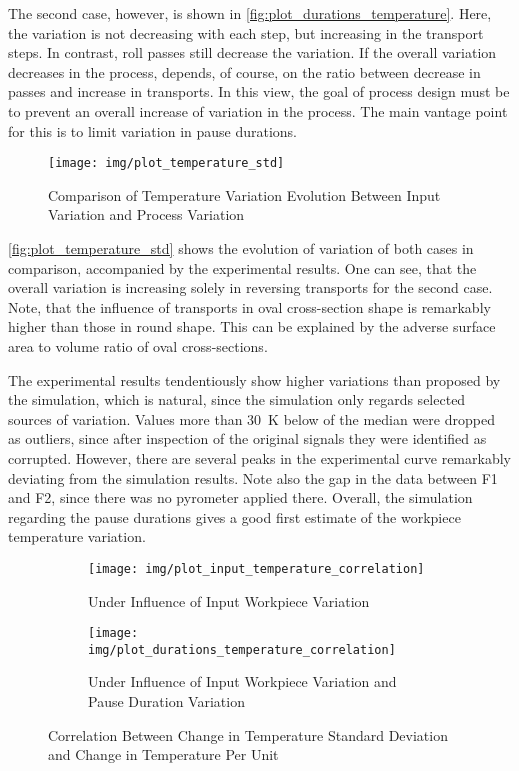 The second case, however, is shown in \autoref{fig:plot_durations_temperature}.
Here, the variation is not decreasing with each step, but increasing in the transport steps.
In contrast, roll passes still decrease the variation.
If the overall variation decreases in the process, depends, of course, on the ratio between decrease in passes and increase in transports.
In this view, the goal of process design must be to prevent an overall increase of variation in the process.
The main vantage point for this is to limit variation in pause durations.

\begin{figure}
    \centering
    \texttt{[image: img/plot\_temperature\_std]}
    \caption{Comparison of Temperature Variation Evolution Between Input Variation and Process Variation}
    \label{fig:plot_temperature_std}
\end{figure}

\autoref{fig:plot_temperature_std} shows the evolution of variation of both cases in comparison, accompanied by the experimental results.
One can see, that the overall variation is increasing solely in reversing transports for the second case.
Note, that the influence of transports in oval cross-section shape is remarkably higher than those in round shape.
This can be explained by the adverse surface area to volume ratio of oval cross-sections.

The experimental results tendentiously show higher variations than proposed by the simulation, which is natural, since the simulation only regards selected sources of variation.
Values more than \qty{30}{\kelvin} below of the median were dropped as outliers, since after inspection of the original signals they were identified as corrupted.
However, there are several peaks in the experimental curve remarkably deviating from the simulation results.
Note also the gap in the data between F1 and F2, since there was no pyrometer applied there.
Overall, the simulation regarding the pause durations gives a good first estimate of the workpiece temperature variation.

\begin{figure}
    \begin{subfigure}{\linewidth}
        \centering
        \texttt{[image: img/plot\_input\_temperature\_correlation]}
        \caption{Under Influence of Input Workpiece Variation}
        \label{fig:plot_input_temperature_correlation}
    \end{subfigure}
    \begin{subfigure}{\linewidth}
        \centering
        \texttt{[image: img/plot\_durations\_temperature\_correlation]}
        \caption{Under Influence of Input Workpiece Variation and Pause Duration Variation}
        \label{fig:plot_durations_temperature_correlation}
    \end{subfigure}
    \caption{Correlation Between Change in Temperature Standard Deviation and Change in Temperature Per Unit}
\end{figure}

